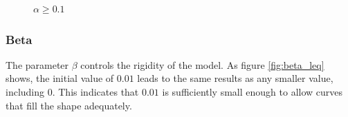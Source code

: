\begin{figure}[!hbt]
\centering   
{}
\caption{$\alpha \geq 0.1$}
\label{fig:alpha_geq}
\end{figure}

\subsubsection{Beta}

The parameter $\beta$ controls the rigidity of the model. As figure \ref{fig:beta_leq} shows, the initial value of $0.01$ leads to the same results as any smaller value, including $0$. This indicates that $0.01$ is sufficiently small enough to allow curves that fill the shape adequately.

